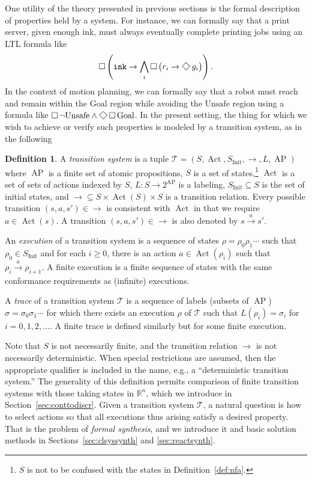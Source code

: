 \documentclass{amsart}
\DeclareMathOperator{\Act}{Act}
\DeclareMathOperator{\ap}{AP}
\theoremstyle{plain}
\theoremstyle{definition}
\newtheorem{defn}{Definition}
\theoremstyle{definition}
\begin{document}
One utility of the theory presented in previous sections is the formal
description of properties held by a system.  For instance, we can formally say
that a print server, given enough ink, must always eventually complete printing
jobs using an LTL formula like
\[
\Galways\left(\mathtt{ink}\rightarrow \bigwedge_{i}\Galways\left( r_i \rightarrow \Feventually g_i \right)\right) .
\]
In the context of motion planning, we can formally say that a robot must reach
and remain within the $\mathrm{Goal}$ region while avoiding the
$\mathrm{Unsafe}$ region using a formula like $\Galways \neg\mathrm{Unsafe} \wedge
\Feventually\Galways \mathrm{Goal}$.  In the present setting, the thing for which we wish to
achieve or verify such properties is modeled by a transition system, as in the
following
\begin{defn}\label{def:ts}
A \textit{transition system} is a tuple $\mathcal{T} = (S,\Act, S_{\mathrm{Init}},
\longrightarrow, L, \ap)$ where $\ap$ is a finite set of atomic propositions, $S$
is a set of states,\footnote{$S$ is not to be confused with the states in
  Definition~\ref{def:nfa}.} $\Act$ is a set of sets of actions indexed by $S$,
$L:S\rightarrow 2^{\ap}$ is a labeling, $S_{\mathrm{Init}}\subseteq S$ is the
set of initial states, and $\longrightarrow\subseteq S\times\Act(S)\times S$ is
a transition relation.  Every possible transition $(s,a,s')\in \longrightarrow$
is consistent with $\Act$ in that we require $a\in\Act(s)$. A transition
$(s,a,s')\in\longrightarrow$ is also denoted by $s \overset{a}{\longrightarrow} s'$.

An \textit{execution} of a transition system is a sequence of states
$\rho=\rho_0 \rho_1 \cdots$ such that $\rho_0 \in S_{\mathrm{Init}}$ and for
each $i\geq 0$, there is an action $a\in\Act(\rho_i)$ such that $\rho_i
\overset{a}{\longrightarrow}\rho_{i+1}$.  A finite execution is a finite
sequence of states with the same conformance requirements as (infinite)
executions.

A \textit{trace} of a transition system $\mathcal{T}$ is a sequence of labels (subsets of
$\ap$) $\sigma=\sigma_0 \sigma_1 \cdots$ for which there exists an execution
$\rho$ of $\mathcal{T}$ such that $L(\rho_{i})=\sigma_{i}$ for $i=0,1,2,\ldots$.  A finite
trace is defined similarly but for some finite execution.
\end{defn}
Note that $S$ is not necessarily finite, and the transition relation
$\longrightarrow$ is not necessarily deterministic.  When special restrictions
are assumed, then the appropriate qualifier is included in the name, e.g., a
``deterministic transition system.''  The generality of this definition permits
comparison of finite transition systems with those taking states in
$\mathbb{R}^n$, which we introduce in Section~\ref{sec:conttodiscr}.  Given a
transition system $\mathcal{T}$, a natural question is how to select actions so that all
executions thus arising satisfy a desired property.  That is the problem of
\textit{formal synthesis}, and we introduce it and basic solution methods in
Sections~\ref{sec:clsyssynth} and \ref{sec:reactsynth}.
\end{document}
